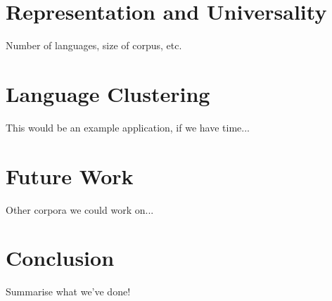 \documentclass[11pt]{article}
\begin{document}
\section{Representation and Universality}

Number of languages, size of corpus, etc.


\section{Language Clustering}

This would be an example application, if we have time...


\section{Future Work}

Other corpora we could work on...


\section{Conclusion}

Summarise what we've done!



\end{document}
